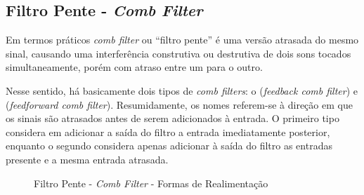 		
		
	\subsection{Filtro Pente - \textit{Comb Filter}}
	\label{secao-comb-filter}
		
		Em termos práticos \textit{comb filter} ou “filtro pente” é uma versão atrasada do mesmo sinal, causando uma  interferência construtiva ou destrutiva de dois sons tocados simultaneamente, porém com atraso entre um para o outro. 
		
		Nesse sentido, há basicamente dois tipos de \textit{comb filters}: o (\textit{feedback comb filter}) e (\textit{feedforward comb filter}). Resumidamente, os nomes referem-se à direção em que os sinais são atrasados antes de serem adicionados à entrada. O primeiro tipo considera em adicionar a saída do filtro a entrada imediatamente posterior, enquanto o segundo considera apenas adicionar à saída do filtro as entradas presente e a mesma entrada atrasada.
		
		\begin{figure}[!ht]
			\centering
			\qquad
			\caption{Filtro Pente - \textit{Comb Filter} - Formas de Realimentação}
			\label{fig01-combfilter}
		\end{figure}
		
